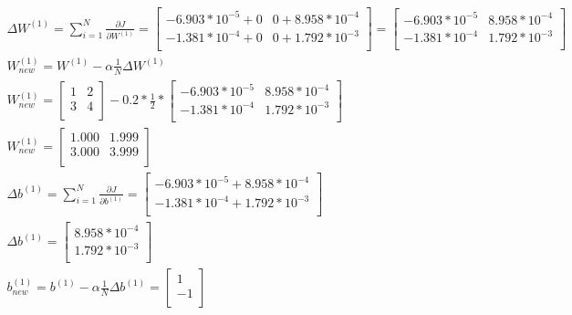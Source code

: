 \documentclass[leqno]{article}
\begin{document}
\begin{gather*}
\begin{split}
&\Delta W^{(1)} = \sum_{i = 1}^N \frac{\partial J}{\partial W^{(1)}} =
  \begin{bmatrix}
    -6.903*10^{-5} + 0 & 0 + 8.958*10^{-4}\\
   -1.381*10^{-4} + 0 & 0 + 1.792*10^{-3}\\
  \end{bmatrix}
=
  \begin{bmatrix}
  -6.903*10^{-5} & 8.958*10^{-4}\\
  -1.381*10^{-4} & 1.792*10^{-3}\\
  \end{bmatrix}
  \\
&W_{new}^{(1)} = W^{(1)} - \alpha\frac{1}{N}\Delta W^{(1)}\\
&W_{new}^{(1)} = 
\begin{bmatrix}
1 & 2\\
3 & 4\\
\end{bmatrix}
- 0.2 * \frac{1}{2} *
\begin{bmatrix}
-6.903*10^{-5} & 8.958*10^{-4}\\
-1.381*10^{-4} & 1.792*10^{-3}\\
\end{bmatrix}\\
&W_{new}^{(1)} = 
\begin{bmatrix}
1.000 & 1.999\\
3.000 & 3.999\\
\end{bmatrix}\\
&\Delta b^{(1)} = \sum_{i = 1}^N \frac{\partial J}{\partial b^{(1)}} =
\begin{bmatrix}
-6.903*10^{-5} + 8.958*10^{-4} \\
-1.381*10^{-4} + 1.792*10^{-3}\\
\end{bmatrix}\\
&\Delta b^{(1)} =
\begin{bmatrix}
8.958*10^{-4} \\
1.792*10^{-3}\\
\end{bmatrix}\\
&b_{new}^{(1)} = b^{(1)} - \alpha\frac{1}{N}\Delta b^{(1)} = 
\begin{bmatrix}
1\\
-1\\
\end{bmatrix} 

\end{split}
\end{gather*}
\end{document}

